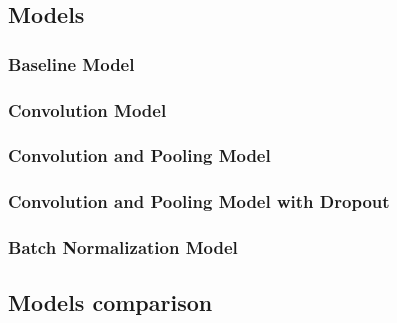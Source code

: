\documentclass[a4paper,12pt]{article}
\begin{document}
\newcommand{\conv}{Convolution(\texttt{Conv2d})}
\newcommand{\convP}[3]{\texttt{k=#1, s=#2, f=#3}}
\newcommand{\convKSF}[3]{\convP{#1}{#2}{#3}}

\newcommand{\flt}{Flatten(\texttt{Flatten})}

\newcommand{\dns}{Dense(\texttt{Dense})}
\newcommand{\dnsP}[1]{\texttt{u=#1}}

\newcommand{\pool}{MaxPooling(\texttt{MaxPooling2D})}
\newcommand{\poolN}{\texttt{p=2x2}}

\newcommand{\drop}{Dropout(\texttt{Dropout})}
\newcommand{\dropR}[1]{\texttt{r=#1}}

\newcommand{\bat}{Batch Norm.(\texttt{BatchN.})}
\subsection{Models}

\subsubsection{Baseline Model}


\subsubsection{Convolution Model}


\subsubsection{Convolution and Pooling Model}


\subsubsection{Convolution and Pooling Model with Dropout}


\subsubsection{Batch Normalization Model}


\subsection{Models comparison}

\end{document}
